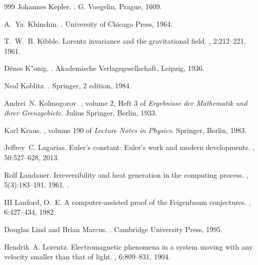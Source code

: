 \begin{thebibliography}{999}
Johannes Kepler.
.
\newblock G. Voegelin, Prague, 1609.

A.~Ya. Khinchin.
.
\newblock University of Chicago Press, 1964.

T.~W.~B. Kibble.
\newblock Lorentz invariance and the gravitational field.
, 2:212--221, 1961.

D{\'e}nes K{"o}nig.
.
\newblock Akademische Verlagsgesellschaft, Leipzig, 1936.

Neal Koblitz.
.
\newblock Springer, 2 edition, 1984.

Andrei~N. Kolmogorov.
, volume 2, Heft 3
  of {\em Ergebnisse der Mathematik und ihrer Grenzgebiete}.
\newblock Julius Springer, Berlin, 1933.

Karl Kraus.
, volume 190 of {\em Lecture Notes in Physics}.
\newblock Springer, Berlin, 1983.

Jeffrey~C. Lagarias.
\newblock Euler's constant: Euler's work and modern developments.
, 50:527--628,
  2013.

Rolf Landauer.
\newblock Irreversibility and heat generation in the computing process.
, 5(3):183--191, 1961.
\newblock \href {https://doi.org/10.1147/rd.53.0183}
  {}.

III Lanford, O.~E.
\newblock A computer-assisted proof of the {Feigenbaum} conjectures.
, 6:427--434,
  1982.

Douglas Lind and Brian Marcus.
.
\newblock Cambridge University Press, 1995.

Hendrik~A. Lorentz.
\newblock Electromagnetic phenomena in a system moving with any velocity
  smaller than that of light.
, 6:809--831, 1904.


\end{thebibliography}
